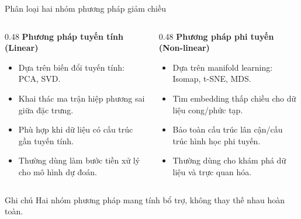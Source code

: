 \begin{frame}{Phân loại hai nhóm phương pháp giảm chiều}
    \begin{columns}[T,onlytextwidth]
        \begin{column}{0.48\textwidth}
            \textbf{Phương pháp tuyến tính (Linear)}
            \vspace{0.4em}
            \begin{itemize}
                \item Dựa trên biến đổi tuyến tính: PCA, SVD.
                \item Khai thác ma trận hiệp phương sai giữa đặc trưng.
                \item Phù hợp khi dữ liệu có cấu trúc gần tuyến tính.
                \item Thường dùng làm bước tiền xử lý cho mô hình dự đoán.
            \end{itemize}
        \end{column}

        \begin{column}{0.48\textwidth}
            \textbf{Phương pháp phi tuyến (Non-linear)}
            \vspace{0.4em}
            \begin{itemize}
                \item Dựa trên manifold learning: Isomap, t-SNE, MDS.
                \item Tìm embedding thấp chiều cho dữ liệu cong/phức tạp.
                \item Bảo toàn cấu trúc lân cận/cấu trúc hình học phi tuyến.
                \item Thường dùng cho khám phá dữ liệu và trực quan hóa.
            \end{itemize}
        \end{column}
    \end{columns}

    \vspace{0.3em}
    \begin{alertblock}{Ghi chú}
        Hai nhóm phương pháp mang tính bổ trợ, không thay thế nhau hoàn toàn.
    \end{alertblock}
\end{frame}


